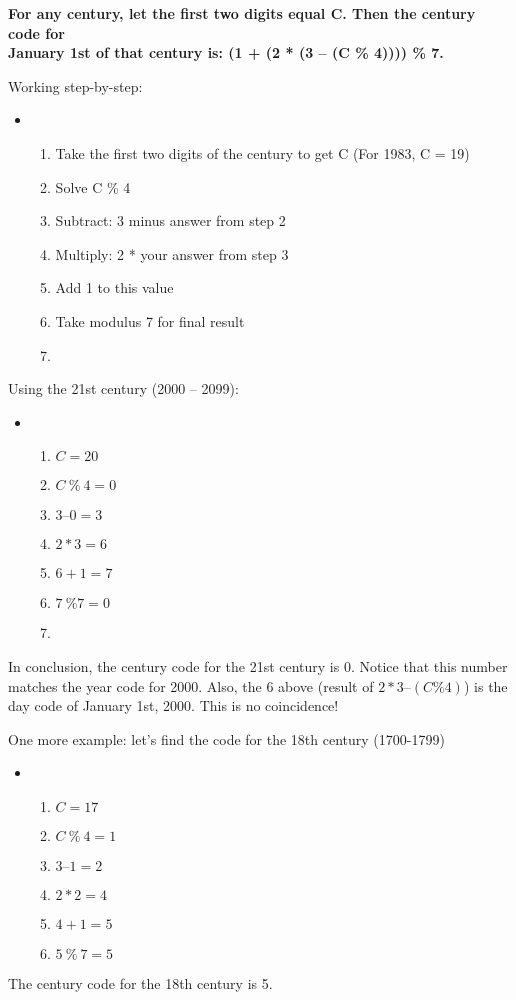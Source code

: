 \documentclass{article}
\begin{document}
  \begin{center}
  \textbf{For any century, let the first two digits equal C. 
  Then the century code for\\ 
  January 1st of that century is: (1 + (2 * (3 – (C \% 4)))) \% 7.}\\
  \end{center}

  Working step-by-step:
  \begin{itemize} \item[] \begin{enumerate}
    \item Take the first two digits of the century to get C (For 1983, C = 19)
    \item Solve C \% 4
    \item Subtract: 3 minus answer from step 2
    \item Multiply: 2 * your answer from step 3
    \item Add 1 to this value
    \item Take modulus 7 for final result
    \item[]
  \end{enumerate}\end{itemize}

  Using the 21st century (2000 – 2099):
  \begin{itemize} \item[] \begin{enumerate}
    \item $C = 20$
    \item $C \ \% \ 4= 0$
    \item $3–0= 3$
    \item $2*3= 6$
    \item $6+ 1= 7$
    \item $7 \ \% 7= 0$
    \item[]
  \end{enumerate}\end{itemize}

  In conclusion, the century code for the 21st century is 0. 
  Notice that this number matches the year code for 2000. 
  Also, the 6 above (result of $2 * 3 – (C\%4)$) is the day code of January 1st, 2000. 
  This is no coincidence!

\newpage

  One more example: let's find the code for the 18th century (1700-1799)
  \begin{itemize} \item[] \begin{enumerate}
    \item $C = 17$
    \item $C \ \% \ 4= 1$
    \item $3–1= 2$
    \item $2*2= 4$
    \item $4 + 1 = 5$
    \item $5 \ \% \ 7 = 5$
  \end{enumerate}\end{itemize}
  The century code for the 18th century is 5.
\end{document}
